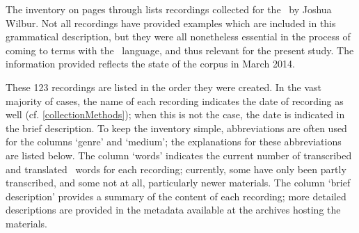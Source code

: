 %

\label{inventory}\hypertarget{inventoryRef}{}
The inventory on pages \pageref{inventoryBegin} through \pageref{inventoryEnd} 
lists recordings collected for the \PSDP\ by Joshua Wilbur. Not all recordings have provided examples which are included in this grammatical description, but they were all nonetheless essential in the process of coming to terms with the \PS\ language, and thus relevant for the present study. 
The information provided reflects the state of the corpus in March 2014. 

These 123 recordings are listed in the order they were created. In the vast majority of cases, the name of each recording indicates the date of recording as well (cf. \SEC\ref{collectionMethods}); when this is not the case, the date is indicated in the brief description. To keep the inventory simple, %
abbreviations are often used for the columns ‘genre’ and ‘medium’; %
the explanations for these abbreviations are listed below. %
The column ‘words’ indicates the current number of transcribed and translated \PS\ words for each recording; currently, some have only been partly transcribed, and some not at all, particularly newer materials. 
The column ‘brief description’ provides a summary of the content of each recording; more detailed descriptions are provided in the metadata available at the archives hosting the materials. 


